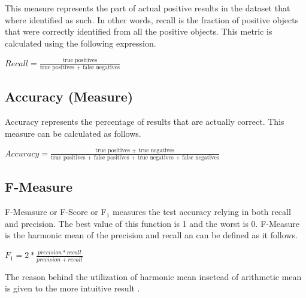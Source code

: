This measure represents the part of actual positive results in the dataset that
where identified as such. In other words, recall is the fraction of positive
objects that were correctly identified from all the positive objects. This
metric is calculated using the following expression.

\begin{center}
\Large
\begin{math}
Recall = \frac{\text{true positives}}{\text{true positives + false negatives}}
\end{math}
\normalsize
\end{center}

\subsection{Accuracy (Measure)}

Accuracy represents the percentage of results that are actually correct. This
measure can be calculated as follows.

\begin{center}
\Large
\begin{math}
Accuracy = \frac{\text{true positives + true negatives}}{\text{true positives + false positives + true negatives + false negatives}}
\end{math}
\normalsize
\end{center}


\subsection{F-Measure}

F-Mesasure or F-Score or F\begin{math}_1 \end{math} measures the test accuracy relying in both recall
and precision. The best value of this function is 1 and the worst is 0.
F-Measure is the harmonic mean of the precision and recall an can be defined as
it follows.

\begin{center}
\Large
\begin{math}
F_1 = 2 * \frac{precision*recall}{precision+recall}
\end{math}
\normalsize
\end{center}

The reason behind the utilization of harmonic mean insetead of arithmetic mean
is given to the more intuitive result \cite{sasaki2007truth}.



